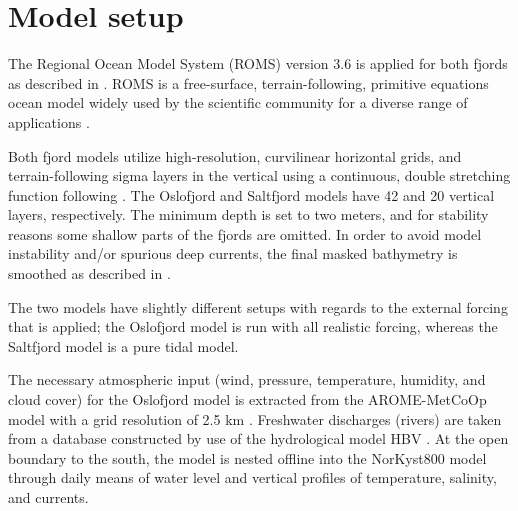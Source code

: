 \section{Model setup}

The Regional Ocean Model System (ROMS) version 3.6 is applied for both fjords as described in \cite{roed16}. ROMS is a free-surface, terrain-following, primitive equations ocean model widely used by the scientific community for a diverse range of applications \cite[]{shchepetkin05,shchepetkin09,haidvogel08}. 

Both fjord models utilize high-resolution, curvilinear horizontal grids, and terrain-following sigma layers in the vertical using a continuous, double stretching function following \cite{shchepetkin09}. The Oslofjord and Saltfjord models have 42 and 20 vertical layers, respectively. The minimum depth is set to two meters, and for stability reasons some shallow parts of the fjords are omitted. In order to avoid model instability and/or spurious deep currents, the final masked bathymetry is smoothed as described in \cite{roed16}.



The two models have slightly different setups with regards to the external forcing that is applied; the Oslofjord model is run with all realistic forcing, whereas the Saltfjord model is a pure tidal model. 

The necessary atmospheric input (wind, pressure, temperature, humidity, and cloud cover) for the Oslofjord model is extracted from the AROME-MetCoOp model with a grid resolution of 2.5 km \cite[]{muller2015}. Freshwater discharges (rivers) are taken from a database constructed by use of the hydrological model HBV \cite[]{beldring2003}. At the open boundary to the south, the model is nested offline into the NorKyst800 model \cite[]{albretsen11} through daily means of water level and vertical profiles of temperature, salinity, and currents.  


